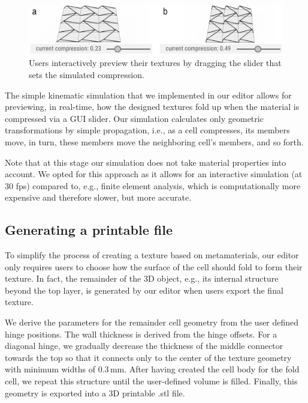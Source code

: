 \begin{figure} [h]  
    \includegraphics[width=\textwidth]{chapters/metamaterial-textures-FIG/17-editor-simulation.pdf}
    \caption[Short figure name.]{Users interactively preview their textures by dragging the slider that sets the simulated compression. 
    \label{fig:17-editor-simulation}}
\end{figure}

The simple kinematic simulation that we implemented in our editor allows for previewing, in real-time, how the designed textures fold up when the material is compressed via a GUI slider. Our simulation calculates only geometric transformations by simple propagation, i.e., as a cell compresses, its members move, in turn, these members move the neighboring cell's members, and so forth. 

Note that at this stage our simulation does not take material properties into account. We opted for this approach as it allows for an interactive simulation (at 30 fps) compared to, e.g., finite element analysis, which is computationally more expensive and therefore slower, but more accurate. 


\subsection{Generating a printable file}

To simplify the process of creating a texture based on metamaterials, our editor only requires users to choose how the surface of the cell should fold to form their texture. In fact, the remainder of the 3D object, e.g., its internal structure beyond the top layer, is generated by our editor when users export the final texture. 

We derive the parameters for the remainder cell geometry from the user defined hinge positions. The wall thickness is derived from the hinge offsets. For a diagonal hinge, we gradually decrease the thickness of the middle connector towards the top so that it connects only to the center of the texture geometry with minimum widths of $0.3\, \mathrm{mm}$. After having created the cell body for the fold cell, we repeat this structure until the user-defined volume is filled. Finally, this geometry is exported into a 3D printable .stl file.



